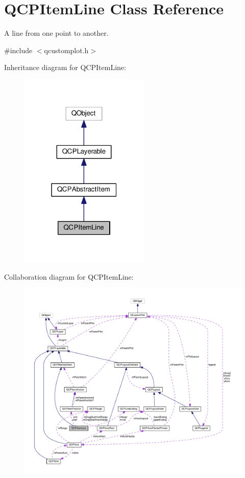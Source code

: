 \hypertarget{classQCPItemLine}{}\section{Q\+C\+P\+Item\+Line Class Reference}
\label{classQCPItemLine}


A line from one point to another.  




{\ttfamily \#include $<$qcustomplot.\+h$>$}



Inheritance diagram for Q\+C\+P\+Item\+Line\+:\nopagebreak
\begin{figure}[H]
\begin{center}
\leavevmode
\includegraphics[width=175pt]{classQCPItemLine__inherit__graph}
\end{center}
\end{figure}


Collaboration diagram for Q\+C\+P\+Item\+Line\+:\nopagebreak
\begin{figure}[H]
\begin{center}
\leavevmode
\includegraphics[width=350pt]{classQCPItemLine__coll__graph}
\end{center}
\end{figure}
